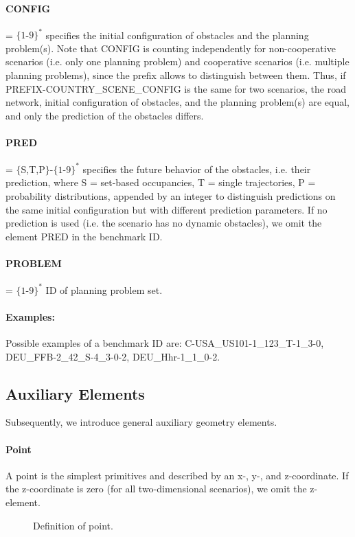 \paragraph{CONFIG} = $\{1$-$9\}^*$ specifies the initial configuration of obstacles and the planning problem(s). Note that CONFIG is counting independently for non-cooperative scenarios (i.e. only one planning problem) and cooperative scenarios (i.e. multiple planning problems), since the prefix allows to distinguish between them. Thus, if PREFIX-COUNTRY\_SCENE\_CONFIG is the same for two scenarios, the road network, initial configuration of obstacles, and the planning problem(s) are equal, and only the prediction of the obstacles differs.

\paragraph{PRED} = $\{$S,T,P$\}$-$\{1$-$9\}^*$ specifies the future behavior of the obstacles, i.e. their prediction, where S = set-based occupancies, T = single trajectories, P = probability distributions, appended by an integer to distinguish predictions on the same initial configuration but with different prediction parameters.
If no prediction is used (i.e. the scenario has no dynamic obstacles), we omit the element PRED in the benchmark ID.

\paragraph{PROBLEM} = $\{1$-$9\}^*$ ID of planning problem set.

\paragraph{Examples:} Possible examples of a benchmark ID are: C-USA\_US101-1\_123\_T-1\_3-0, DEU\_FFB-2\_42\_S-4\_3-0-2, DEU\_Hhr-1\_1\_0-2.

\subsection{Auxiliary Elements} \label{subsec:auxiliary}

Subsequently, we introduce general auxiliary geometry elements.

\paragraph{Point}
A point is the simplest primitives and described by an x-, y-, and z-coordinate.
If the z-coordinate is zero (for all two-dimensional scenarios), we omit the z-element.
\begin{figure}[!htpb]
	\small
	\caption{Definition of point.}
	\label{fig:auxiliary}
\end{figure}


